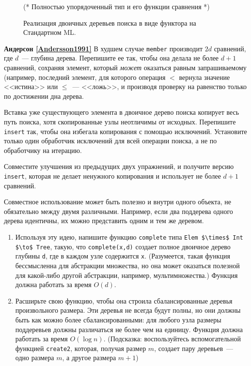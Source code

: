\begin{figure}
  \centering
  (* Полностью упорядоченный тип и его функции сравнения *)
  \caption{Реализация двоичных деревьев поиска в виде функтора на Стандартном ML.}
  \label{fig:2.9}
\end{figure}

\begin{exercise}\textbf{Андерсон \ref{Andersson1991}}\label{ex:2.2}
В худшем случае \lstinline!member! производит $2d$ сравнений, где
$d$~--- глубина дерева. Перепишите ее так, чтобы она делала не более
$d+1$ сравнений, сохраняя элемент, который \emph{может} оказаться
равным запрашиваемому (например, последний элемент, для которого
операция $<$ вернула значение <<истина>> или $\le$~--- <<ложь>>, и
производя проверку на равенство только по достижении дна дерева.
\end{exercise}

\begin{exercise}\label{ex:2.3}
  Вставка уже существующего элемента в двоичное дерево поиска копирует
  весь путь поиска, хотя скопированные узлы неотличимы от
  исходных. Перепишите \lstinline!insert! так, чтобы она избегала
  копирования с помощью исключений. Установите только один обработчик
  исключений для всей операции поиска, а не по обработчику на итерацию.
\end{exercise}

\begin{exercise}\label{ex:2.4}
  Совместите улучшения из предыдущих двух упражнений, и получите
  версию \lstinline!insert!, которая не делает ненужного копирования и
  использует не более $d+1$ сравнений.
\end{exercise}

\begin{exercise}\label{ex:2.5}
  Совместное использование может быть полезно и внутри одного объекта, не
  обязательно между двумя различными.  Например, если два поддерева
  одного дерева идентичны, их можно представить одним и тем же
  деревом.
  \begin{enumerate}
  \item Используя эту идею, напишите функцию \lstinline!complete! типа
    \lstinline!Elem $\times$ Int $\to$ Tree!, такую, что
    \lstinline!complete(x,d)! создает полное двоичное дерево глубины
    \lstinline!d!, где в каждом узле содержится \lstinline!x!.
    (Разумеется, такая функция бессмысленна для абстракции множества,
    но она может оказаться полезной для какой-либо другой абстракции,
    например, мультимножества.) Функция должна работать за время $O(d)$.
  \item Расширьте свою функцию, чтобы она строила сбалансированные
    деревья произвольного размера. Эти деревья не всегда будут полны,
    но они должны быть как можно более сбалансированными: для любого
    узла размеры поддеревьев должны различаться не более чем на
    единицу. Функция должна работать за время $O(\log n)$. (Подсказка:
    воспользуйтесь вспомогательной функцией \lstinline!create2!,
    которая, получая размер $m$, создает пару деревьев~--- одно размера
    $m$, а другое размера $m+1$)
  \end{enumerate}
\end{exercise}

